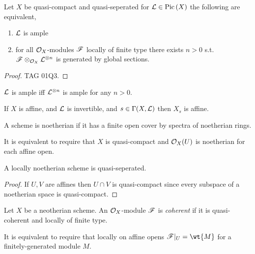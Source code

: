\documentclass[12pt]{article}
\begin{document}
\begin{proposition}
Let $X$ be quasi-compact and quasi-seperated for $\mathcal{L} \in \mathrm{Pic} \left( X \right)$ the following are equivalent,
\begin{enumerate}
\item $\mathcal{L}$ is ample
\item for all $\mathcal{O}_{X}$-modules $\mathscr{F}$ locally of finite type there exists $n > 0$ s.t. $\mathscr{F} \otimes_{\mathcal{O}_{X}} \mathcal{L}^{\otimes n}$ is generated by global sections.
\end{enumerate}
\end{proposition}

\begin{proof}
TAG 01Q3.
\end{proof}

\begin{lemma}
$\mathcal{L}$ is ample iff $\mathcal{L}^{\otimes n}$ is ample for any $n > 0$. 
\end{lemma}

\begin{lemma}
If $X$ is affine, and $\mathcal{L}$ is invertible, and $s \in \Gamma(X, \mathcal{L})$ then $X_s$ is affine. 
\end{lemma}

\begin{definition}
A scheme is noetherian if it has a finite open cover by spectra of noetherian rings. 
\end{definition}

\begin{remark}
It is equivalent to require that $X$ is quasi-compact and $\mathcal{O}_{X}(U)$ is noetherian for each affine open.
\end{remark}

\begin{lemma}
A locally noetherian scheme is quasi-seperated.
\end{lemma}

\begin{proof}
If $U, V$ are affines then $U \cap V$ is quasi-compact since every subspace of a noetherian space is quasi-compact.
\end{proof}

\begin{definition}
Let $X$ be a neotherian scheme. An $\mathcal{O}_{X}$-module $\mathscr{F}$ is \textit{coherent} if it is quasi-coherent and locally of finite type. 
\end{definition}

\begin{remark}
It is equivalent to require that locally on affine opens $\F |_U = \wt{M}$ for a finitely-generated module $M$. 
\end{remark}
\end{document}
